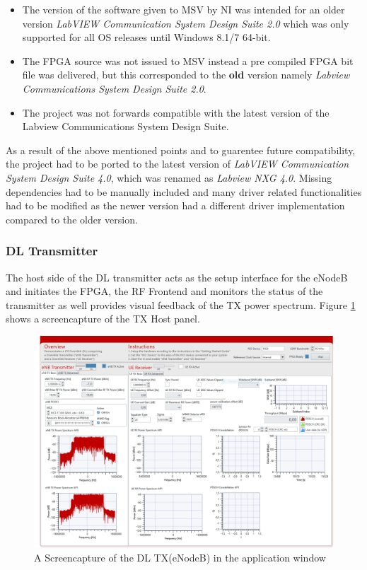 \begin{itemize}
    \item The version of the software given to MSV by NI was intended for an older version \textit{LabVIEW Communication System Design Suite 2.0} which was only supported for all OS releases until Windows 8.1/7 64-bit.

    \item The FPGA source was not issued to MSV instead a pre compiled FPGA bit file was delivered, but this corresponded to the \textbf{old} version namely \textit{Labview Communications System Design Suite 2.0}.

    \item The project was not forwards compatible with the latest version of the Labview Communications System Design Suite.
\end{itemize}

As a result of the above mentioned points and to guarentee future compatibility, the project had to be ported to the latest version of \textit{LabVIEW Communication System Design Suite 4.0}, which was renamed as \textit{Labview NXG 4.0}. Missing dependencies had to be manually included and many driver related functionalities had to be modified as the newer version had a different driver implementation compared to the older version.

\subsubsection{DL Transmitter}\label{ssec:LTEAFWTXOptions}

The host side of the DL transmitter acts as the setup interface for the eNodeB and initiates the FPGA, the RF Frontend and monitors the status of the transmitter as well provides visual feedback of the TX power spectrum. Figure \ref{fig:DLTXScreen} shows a screencapture of the TX Host panel.

\begin{figure}[!htb]
    \centering
    \includegraphics[width=\linewidth]{images/MIMOTX.png}
    \caption{A Screencapture of the DL TX(eNodeB) in the application window}
    \label{fig:DLTXScreen}
\end{figure}

